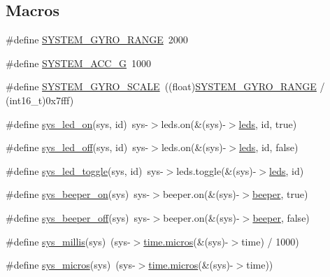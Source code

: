 \subsection*{Macros}
\begin{DoxyCompactItemize}
\item 
\#define \hyperlink{group__syscalls_ga31eeb68f9228f41e1236be8046edbd68}{S\+Y\+S\+T\+E\+M\+\_\+\+G\+Y\+R\+O\+\_\+\+R\+A\+N\+G\+E}~2000
\item 
\#define \hyperlink{group__syscalls_ga740389ee12d3d7d228842e21dcf9c5b0}{S\+Y\+S\+T\+E\+M\+\_\+\+A\+C\+C\+\_\+G}~1000
\item 
\#define \hyperlink{group__syscalls_ga8339dd5d6d4fd7f8029a2331bd7d511b}{S\+Y\+S\+T\+E\+M\+\_\+\+G\+Y\+R\+O\+\_\+\+S\+C\+A\+L\+E}~((float)\hyperlink{group__syscalls_ga31eeb68f9228f41e1236be8046edbd68}{S\+Y\+S\+T\+E\+M\+\_\+\+G\+Y\+R\+O\+\_\+\+R\+A\+N\+G\+E} / (int16\+\_\+t)0x7fff)
\item 
\#define \hyperlink{group__syscalls_ga5bc1c411a83f8b72eb53ed6dac7692bc}{sys\+\_\+led\+\_\+on}(sys, id)~sys-\/$>$leds.\+on(\&(sys)-\/$>$\hyperlink{config_2ledstrip_8h_afb8a5fc2cb2bd2f269db76087ddee126}{leds}, id, true)
\item 
\#define \hyperlink{group__syscalls_ga1c81ca81429f1ef4521ec0126f3d163d}{sys\+\_\+led\+\_\+off}(sys, id)~sys-\/$>$leds.\+on(\&(sys)-\/$>$\hyperlink{config_2ledstrip_8h_afb8a5fc2cb2bd2f269db76087ddee126}{leds}, id, false)
\item 
\#define \hyperlink{group__syscalls_gaaa801a62b798cd4e5cec60f507ea31fb}{sys\+\_\+led\+\_\+toggle}(sys, id)~sys-\/$>$leds.\+toggle(\&(sys)-\/$>$\hyperlink{config_2ledstrip_8h_afb8a5fc2cb2bd2f269db76087ddee126}{leds}, id)
\item 
\#define \hyperlink{group__syscalls_ga4a79c65d8a3f04ea401ed053a79945ca}{sys\+\_\+beeper\+\_\+on}(sys)~sys-\/$>$beeper.\+on(\&(sys)-\/$>$\hyperlink{structbeeper}{beeper}, true)
\item 
\#define \hyperlink{group__syscalls_ga9c2f4a3215833c6fd41329527f153029}{sys\+\_\+beeper\+\_\+off}(sys)~sys-\/$>$beeper.\+on(\&(sys)-\/$>$\hyperlink{structbeeper}{beeper}, false)
\item 
\#define \hyperlink{group__syscalls_ga0474fce5bba35dd2abb3f6f7e96906f6}{sys\+\_\+millis}(sys)~(sys-\/$>$\hyperlink{flight__altitudehold__unittest_8cc_af543edc4b91ee97e556de2f0bbc709ad}{time.\+micros}(\&(sys)-\/$>$time) / 1000)
\item 
\#define \hyperlink{group__syscalls_ga37cb11698e12be4f5018e020fa506e5a}{sys\+\_\+micros}(sys)~(sys-\/$>$\hyperlink{flight__altitudehold__unittest_8cc_af543edc4b91ee97e556de2f0bbc709ad}{time.\+micros}(\&(sys)-\/$>$time))

\end{DoxyCompactItemize}
